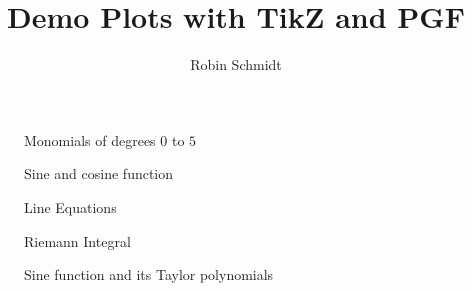 




\title{Demo Plots with TikZ and PGF}
\author{Robin Schmidt}
\maketitle



\begin{figure}[h]
\centering
\caption{Monomials of degrees $0$ to $5$}
\label{Fig:Monomials}
\pgfplotsset{width=8cm} 

\end{figure}


\begin{figure}[h]
\centering
\caption{Sine and cosine function}
\label{Fig:SineAndCosine}

\end{figure}


\begin{figure}[h]
\centering
\caption{Line Equations}
\label{Fig:Line}

\end{figure}


\begin{figure}[h]
\centering
\caption{Riemann Integral}
\label{Fig:RiemannIntegral}

\end{figure}



\begin{figure}[h]
\centering
\caption{Sine function and its Taylor polynomials}
\label{Fig:TaylorExpansionSine}
\pgfplotsset{width=19cm,height=6cm}

\end{figure}

